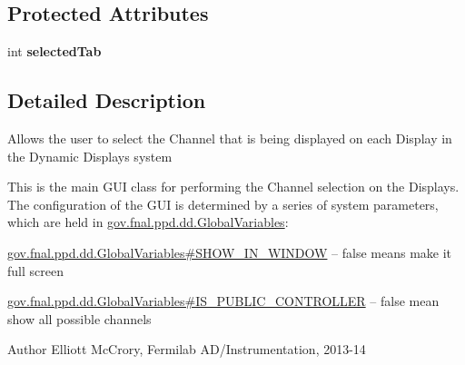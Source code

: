 \subsection*{Protected Attributes}
\begin{DoxyCompactItemize}
\item 
\hypertarget{classgov_1_1fnal_1_1ppd_1_1dd_1_1ChannelSelector_a362da806f034eb1259564c1db7e67ad5}{int {\bfseries selected\-Tab}}\label{classgov_1_1fnal_1_1ppd_1_1dd_1_1ChannelSelector_a362da806f034eb1259564c1db7e67ad5}

\end{DoxyCompactItemize}


\subsection{Detailed Description}
Allows the user to select the Channel that is being displayed on each Display in the Dynamic Displays system 

This is the main G\-U\-I class for performing the Channel selection on the Displays. The configuration of the G\-U\-I is determined by a series of system parameters, which are held in \hyperlink{classgov_1_1fnal_1_1ppd_1_1dd_1_1GlobalVariables}{gov.\-fnal.\-ppd.\-dd.\-Global\-Variables}\-: 
\begin{DoxyItemize}
\item \hyperlink{classgov_1_1fnal_1_1ppd_1_1dd_1_1GlobalVariables_af0e7b37c8bf6495b999b93ed0f4f1c76}{gov.\-fnal.\-ppd.\-dd.\-Global\-Variables\#\-S\-H\-O\-W\-\_\-\-I\-N\-\_\-\-W\-I\-N\-D\-O\-W} -- false means make it full screen 
\item \hyperlink{classgov_1_1fnal_1_1ppd_1_1dd_1_1GlobalVariables_a01fec82f5b2996d3e0c41c1f52d884a0}{gov.\-fnal.\-ppd.\-dd.\-Global\-Variables\#\-I\-S\-\_\-\-P\-U\-B\-L\-I\-C\-\_\-\-C\-O\-N\-T\-R\-O\-L\-L\-E\-R} -- false mean show all possible channels 
\end{DoxyItemize}

\begin{DoxyAuthor}{Author}
Elliott Mc\-Crory, Fermilab A\-D/\-Instrumentation, 2013-\/14 
\end{DoxyAuthor}


